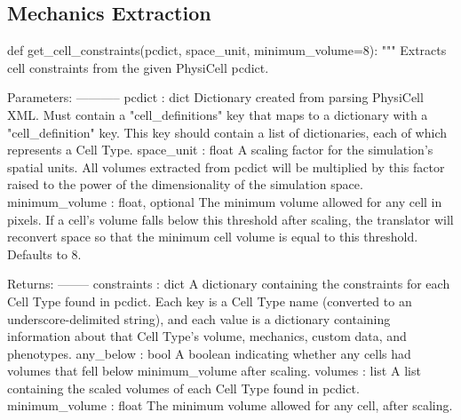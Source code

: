 \subsection{Mechanics Extraction}
\begin{python}
def get_cell_constraints(pcdict, space_unit, minimum_volume=8):
    """
    Extracts cell constraints from the given PhysiCell pcdict.

    Parameters:
    -----------
    pcdict : dict
        Dictionary created from parsing PhysiCell XML. Must contain a "cell_definitions" key that maps
        to a dictionary with a "cell_definition" key. This key should contain a list of dictionaries, each of which
        represents a Cell Type.
    space_unit : float
        A scaling factor for the simulation's spatial units. All volumes extracted from pcdict will be multiplied by
        this factor raised to the power of the dimensionality of the simulation space.
    minimum_volume : float, optional
        The minimum volume allowed for any cell in pixels. If a cell's volume falls below this threshold after scaling,
        the translator will reconvert space so that the minimum cell volume is  equal to this threshold. Defaults to 8.

    Returns:
    --------
    constraints : dict
        A dictionary containing the constraints for each Cell Type found in pcdict. Each key is a Cell Type name
        (converted to an underscore-delimited string), and each value is a dictionary containing information about
        that Cell Type's volume, mechanics, custom data, and phenotypes.
    any_below : bool
        A boolean indicating whether any cells had volumes that fell below minimum_volume after scaling.
    volumes : list
        A list containing the scaled volumes of each Cell Type found in pcdict.
    minimum_volume : float
        The minimum volume allowed for any cell, after scaling.


\end{python}
